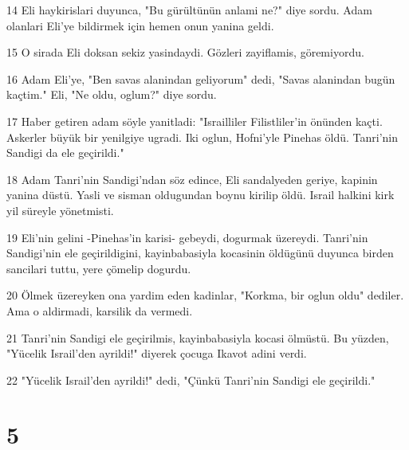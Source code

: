 \par 14 Eli haykirislari duyunca, "Bu gürültünün anlami ne?" diye sordu. Adam olanlari Eli'ye bildirmek için hemen onun yanina geldi.
\par 15 O sirada Eli doksan sekiz yasindaydi. Gözleri zayiflamis, göremiyordu.
\par 16 Adam Eli'ye, "Ben savas alanindan geliyorum" dedi, "Savas alanindan bugün kaçtim." Eli, "Ne oldu, oglum?" diye sordu.
\par 17 Haber getiren adam söyle yanitladi: "Israilliler Filistliler'in önünden kaçti. Askerler büyük bir yenilgiye ugradi. Iki oglun, Hofni'yle Pinehas öldü. Tanri'nin Sandigi da ele geçirildi."
\par 18 Adam Tanri'nin Sandigi'ndan söz edince, Eli sandalyeden geriye, kapinin yanina düstü. Yasli ve sisman oldugundan boynu kirilip öldü. Israil halkini kirk yil süreyle yönetmisti.
\par 19 Eli'nin gelini -Pinehas'in karisi- gebeydi, dogurmak üzereydi. Tanri'nin Sandigi'nin ele geçirildigini, kayinbabasiyla kocasinin öldügünü duyunca birden sancilari tuttu, yere çömelip dogurdu.
\par 20 Ölmek üzereyken ona yardim eden kadinlar, "Korkma, bir oglun oldu" dediler. Ama o aldirmadi, karsilik da vermedi.
\par 21 Tanri'nin Sandigi ele geçirilmis, kayinbabasiyla kocasi ölmüstü. Bu yüzden, "Yücelik Israil'den ayrildi!" diyerek çocuga Ikavot adini verdi.
\par 22 "Yücelik Israil'den ayrildi!" dedi, "Çünkü Tanri'nin Sandigi ele geçirildi."

\chapter{5}

